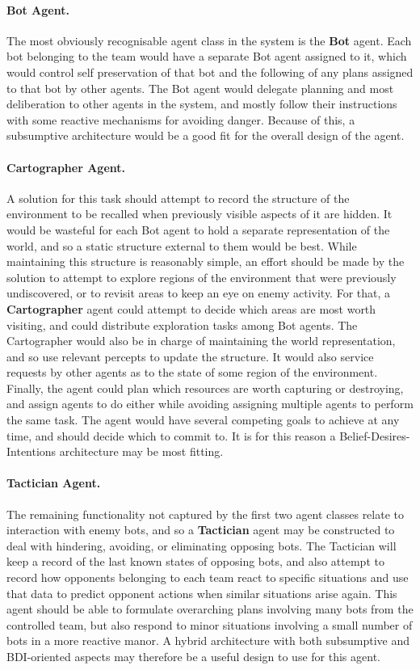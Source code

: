 \documentclass[a4paper,10pt]{article}
\begin{document}
\paragraph{Bot Agent.}
The most obviously recognisable agent class in the system is the \textbf{Bot} agent. Each bot belonging to the team would have a separate Bot agent assigned to it, which would control self preservation of that bot and the following of any plans assigned to that bot by other agents. The Bot agent would delegate planning and most deliberation to other agents in the system, and mostly follow their instructions with some reactive mechanisms for avoiding danger. Because of this, a subsumptive architecture\cite{brooks90} would be a good fit for the overall design of the agent.

\paragraph{Cartographer Agent.}
A solution for this task should attempt to record the structure of the environment to be recalled when previously visible aspects of it are hidden. It would be wasteful for each Bot agent to hold a separate representation of the world, and so a static structure external to them would be best. While maintaining this structure is reasonably simple, an effort should be made by the solution to attempt to explore regions of the environment that were previously undiscovered, or to revisit areas to keep an eye on enemy activity. For that, a \textbf{Cartographer} agent could attempt to decide which areas are most worth visiting, and could distribute exploration tasks among Bot agents. The Cartographer would also be in charge of maintaining the world representation, and so use relevant percepts to update the structure. It would also service requests by other agents as to the state of some region of the environment. Finally, the agent could plan which resources are worth capturing or destroying, and assign agents to do either while avoiding assigning multiple agents to perform the same task. The agent would have several competing goals to achieve at any time, and should decide which to commit to. It is for this reason a Belief-Desires-Intentions\cite{rao95} architecture may be most fitting.

\paragraph{Tactician Agent.}
The remaining functionality not captured by the first two agent classes relate to interaction with enemy bots, and so a \textbf{Tactician} agent may be constructed to deal with hindering, avoiding, or eliminating opposing bots. The Tactician will keep a record of the last known states of opposing bots, and also attempt to record how opponents belonging to each team react to specific situations and use that data to predict opponent actions when similar situations arise again. This agent should be able to formulate overarching plans involving many bots from the controlled team, but also respond to minor situations involving a small number of bots in a more reactive manor. A hybrid architecture with both subsumptive and BDI-oriented aspects may therefore be a useful design to use for this agent.
\end{document}
